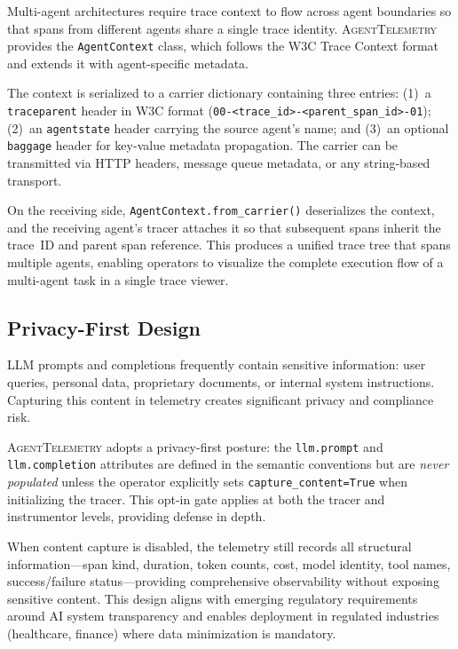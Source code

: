\documentclass[sigconf,nonacm]{acmart}
\begin{document}
Multi-agent architectures require trace context to flow across agent
boundaries so that spans from different agents share a single trace
identity.  \textsc{AgentTelemetry} provides the \texttt{AgentContext}
class, which follows the W3C Trace Context format and extends it with
agent-specific metadata.

The context is serialized to a carrier dictionary containing three
entries: (1)~a \texttt{traceparent} header in W3C format
(\texttt{00-<trace\_id>-<parent\_span\_id>-01}); (2)~an
\texttt{agentstate} header carrying the source agent's name; and
(3)~an optional \texttt{baggage} header for key-value metadata
propagation.  The carrier can be transmitted via HTTP headers, message
queue metadata, or any string-based transport.

On the receiving side, \texttt{AgentContext.from\_carrier()} deserializes
the context, and the receiving agent's tracer attaches it so that
subsequent spans inherit the trace~ID and parent span reference.  This
produces a unified trace tree that spans multiple agents, enabling
operators to visualize the complete execution flow of a multi-agent
task in a single trace viewer.

\subsection{Privacy-First Design}
\label{sec:privacy}

LLM prompts and completions frequently contain sensitive information:
user queries, personal data, proprietary documents, or internal system
instructions.  Capturing this content in telemetry creates significant
privacy and compliance risk.

\textsc{AgentTelemetry} adopts a privacy-first posture: the
\texttt{llm.prompt} and \texttt{llm.completion} attributes are defined in
the semantic conventions but are \emph{never populated} unless the operator
explicitly sets \texttt{capture\_content=True} when initializing the
tracer.  This opt-in gate applies at both the tracer and instrumentor
levels, providing defense in depth.

When content capture is disabled, the telemetry still records all
structural information---span kind, duration, token counts, cost, model
identity, tool names, success/failure status---providing comprehensive
observability without exposing sensitive content.  This design aligns
with emerging regulatory requirements around AI system transparency and
enables deployment in regulated industries (healthcare, finance) where
data minimization is mandatory.
\end{document}
